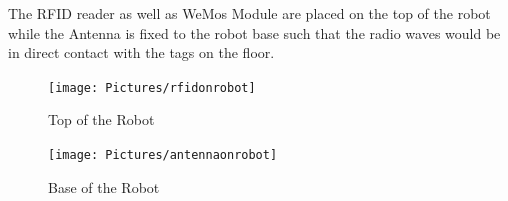 The RFID reader as well as WeMos Module are placed on the top of the robot while the Antenna is fixed to the robot base such that the radio waves would be in direct contact with the tags on the floor.
\begin{figure}[!htbp]
	\centering
	\begin{minipage}{.5\textwidth}
		\centering
		\texttt{[image: Pictures/rfidonrobot]}%
		\caption{Top of the Robot}
		\label{rfid_on_robot}
	\end{minipage}%
	\begin{minipage}{.5\textwidth}
		\centering
		\texttt{[image: Pictures/antennaonrobot]}%
		\caption{Base of the Robot}
		\label{antenna_on_robot}
	\end{minipage}
\end{figure}